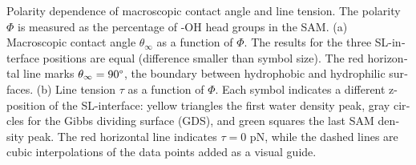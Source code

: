 %
\label{fig:Results}\foreignlanguage{english}{Polarity dependence
of macroscopic contact angle and line tension. The polarity $\Phi$
is measured as the percentage of -OH head groups in the SAM. (a) Macroscopic
contact angle $\theta_{\infty}$ as a function of $\Phi$. The results
for the three SL-interface positions are equal (difference smaller
than symbol size). The red horizontal line marks $\theta_{\infty}=90\text{\textdegree}$,
the boundary between hydrophobic and hydrophilic surfaces. (b) Line
tension $\tau$ as a function of $\Phi$. Each symbol indicates a
different z-position of the SL-interface: yellow triangles the first
water density peak, gray circles for the Gibbs dividing surface (GDS),
and green squares the last SAM density peak. The red horizontal line
indicates $\tau=0$ pN, while the dashed lines are cubic interpolations
of the data points added as a visual guide. }%
